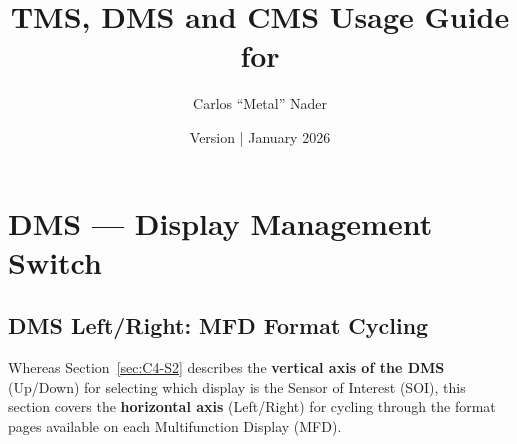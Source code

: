 \documentclass[11pt,a4paper]{article}
\title{TMS, DMS and CMS Usage Guide for \bmsver}
\author{Carlos ``Metal'' Nader}
\date{Version \fulldocversion{0.2.4.0} | January 2026}
\begin{document}
\maketitle

\newpage

\tableofcontents

\newpage







\section{DMS — Display Management Switch}
\label{sec:C4}

\subsection{DMS Left/Right: MFD Format Cycling}
\label{sec:C4-S3}

Whereas Section~\ref{sec:C4-S2} describes the \textbf{vertical axis of the DMS} (Up/Down) for selecting which display is the Sensor of Interest (SOI), this section covers the \textbf{horizontal axis} (Left/Right) for cycling through the format pages available on each Multifunction Display (MFD).
\end{document}

